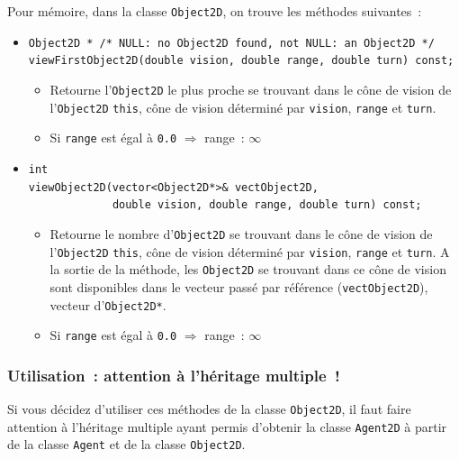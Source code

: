\documentclass[12pt]{article}
\begin{document}
Pour m\'emoire, dans la classe {\tt Object2D},
on trouve les m\'ethodes suivantes~:

\vspace{0.2cm}
\begin{itemize}
\item \verb!Object2D * /* NULL: no Object2D found, not NULL: an Object2D */!\\
      \verb!viewFirstObject2D(double vision, double range, double turn) const;!
      \begin{itemize}
      \item Retourne l'{\tt Object2D} le plus proche se trouvant dans le
            c\^one de vision de l'{\tt Object2D} {\tt *this},
            c\^one de vision d\'etermin\'e par {\tt vision}, {\tt range} et
            {\tt turn}.
      \item Si {\tt range} est \'egal \`a {\tt 0.0}
            $\Longrightarrow$ range~: $\infty$ 
      \end{itemize}
\vspace{0.2cm}
\item \verb!int!\\
      \verb!viewObject2D(vector<Object2D*>& vectObject2D,!\\
      \verb!             double vision, double range, double turn) const;!
      \begin{itemize}
      \item Retourne le nombre d'{\tt Object2D} se trouvant dans le
            c\^one de vision de l'{\tt Object2D} {\tt *this},
            c\^one de vision d\'etermin\'e par {\tt vision}, {\tt range}
            et {\tt turn}.
            A la sortie de la m\'ethode, les {\tt Object2D} se trouvant dans
            ce c\^one de vision sont disponibles dans le vecteur pass\'e
            par r\'ef\'erence ({\tt vectObject2D}), vecteur d'{\tt Object2D*}.
      \item Si {\tt range} est \'egal \`a {\tt 0.0}
            $\Longrightarrow$ range~: $\infty$ 
      \end{itemize}
\end{itemize}

\subsubsection{Utilisation~: attention \`a l'h\'eritage multiple~!}

Si vous d\'ecidez d'utiliser ces m\'ethodes de la classe {\tt Object2D},
il faut faire attention \`a l'h\'eritage multiple ayant permis
d'obtenir la classe {\tt Agent2D} \`a partir de la classe {\tt Agent}
et de la classe {\tt Object2D}.
\end{document}
